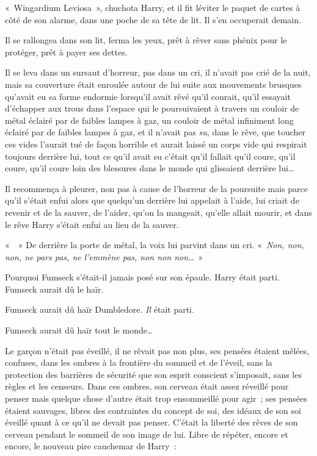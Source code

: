 «~Wingardium Leviosa~», chuchota Harry, et il fit léviter le paquet de cartes à côté de son alarme, dans une poche de sa tête de lit.
Il s'en occuperait demain.

Il se rallongea dans son lit, ferma les yeux, prêt à rêver sans phénix pour le protéger, prêt à payer ses dettes.

\later

Il se leva dans un sursaut d'horreur, pas dans un cri, il n'avait pas crié de la nuit, mais sa couverture était enroulée autour de lui suite aux mouvements brusques qu'avait eu sa forme endormie lorsqu'il avait rêvé qu'il courait, qu'il essayait d'échapper aux trous dans l'espace qui le poursuivaient à travers un couloir de métal éclairé par de faibles lampes à gaz, un couloir de métal infiniment long éclairé par de faibles lampes à gaz, et il n'avait pas \emph{su}, dans le rêve, que toucher ces vides l'aurait tué de façon horrible et aurait laissé un corps vide qui respirait toujours derrière lui, tout ce qu'il avait su c'était qu'il fallait qu'il coure, qu'il coure, qu'il coure loin des blessures dans le monde qui glissaient derrière lui…

Il recommença à pleurer, non pas à cause de l'horreur de la poursuite mais parce qu'il s'était enfui alors que quelqu'un derrière lui appelait à l'aide, lui criait de revenir et de la sauver, de l'aider, qu'on la mangeait, qu'elle allait mourir, et dans le rêve Harry s'était enfui au lieu de la sauver.

«~~» De derrière la porte de métal, la voix lui parvint dans un cri.
«~\emph{Non, non, non, ne pars pas, ne l'emmène pas, non non non…}~»

Pourquoi Fumseck s'était-il jamais posé sur son épaule.
Harry était parti.
Fumseck aurait dû le haïr.

Fumseck aurait dû haïr Dumbledore.
\emph{Il} était parti.

Fumseck aurait dû haïr tout le monde…

Le garçon n'était pas éveillé, il ne rêvait pas non plus, ses pensées étaient mêlées, confuses, dans les ombres à la frontière du sommeil et de l'éveil, sans la protection des barrières de sécurité que son esprit conscient s'imposait, sans les règles et les censeurs.
Dans ces ombres, son cerveau était assez réveillé pour penser mais quelque chose d'autre était trop ensommeillé pour agir~; ses pensées étaient sauvages, libres des contraintes du concept de soi, des idéaux de son soi éveillé quant à ce qu'il ne devait pas penser.
C'était la liberté des rêves de son cerveau pendant le sommeil de son image de lui.
Libre de répéter, encore et encore, le nouveau pire cauchemar de Harry~:

